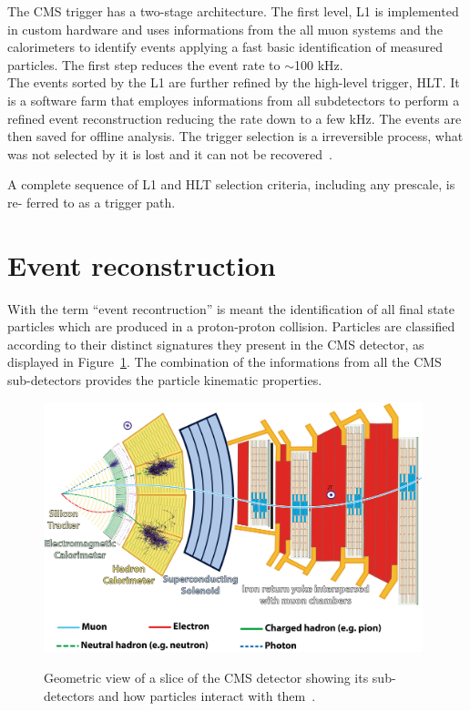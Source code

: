 The CMS trigger has a two-stage architecture. The first level, L1 is
implemented in custom hardware and uses informations from the 
all muon systems and the calorimeters to identify events applying a fast
basic identification of measured particles. The first step reduces the
event rate to $\sim$100 kHz.\\
The events sorted by the L1 are further refined by the
high-level trigger, HLT. It is a software farm that employes informations from all subdetectors to perform a
refined event reconstruction reducing the rate down to a few kHz. The 
events are then saved for offline analysis.
The trigger selection is a irreversible process, what was not selected
by it is lost and it can not be recovered~\cite{Khachatryan_2017}.

A complete sequence of L1
and HLT selection criteria, including any prescale, is re- ferred to
as a trigger path.

\clearpage

\section{Event reconstruction}\label{sec:reconstruction}

With the term ``event recontruction'' is meant the identification of
all final state particles which are produced in a proton-proton
collision. Particles are classified according to their distinct
signatures they present in 
the CMS detector, as displayed in Figure~\ref{fig:cmsslice}. The
combination of the informations from all the CMS sub-detectors provides the particle
kinematic properties.
\begin{figure}[h]
\centering
\includegraphics[width=0.98\textwidth]{Figures/c2/CMSslice.png}\\
\caption{Geometric view of a slice of the CMS detector showing its sub-detectors and how particles interact with them~\cite{Barney:2120661}.}
\label{fig:cmsslice}
\end{figure} 

